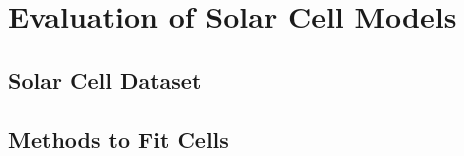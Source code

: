 \section{Evaluation of Solar Cell Models}\label{sec:evaluation_of_solar_cell_models}


\subsection{Solar Cell Dataset}


\subsection{Methods to Fit Cells}